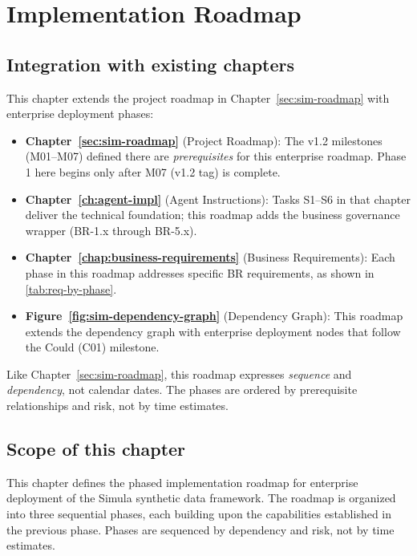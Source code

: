 \chapter{Implementation Roadmap}
\label{chap:implementation-roadmap}

\section*{Integration with existing chapters}

This chapter extends the project roadmap in Chapter~\ref{sec:sim-roadmap} with 
enterprise deployment phases:

\begin{itemize}
  \item \textbf{Chapter~\ref{sec:sim-roadmap}} (Project Roadmap): The v1.2 
    milestones (M01--M07) defined there are \emph{prerequisites} for this 
    enterprise roadmap. Phase 1 here begins only after M07 (v1.2 tag) is complete.
  \item \textbf{Chapter~\ref{ch:agent-impl}} (Agent Instructions): Tasks S1--S6 
    in that chapter deliver the technical foundation; this roadmap adds the 
    business governance wrapper (BR-1.x through BR-5.x).
  \item \textbf{Chapter~\ref{chap:business-requirements}} (Business Requirements): 
    Each phase in this roadmap addresses specific BR requirements, as shown in 
    \cref{tab:req-by-phase}.
  \item \textbf{Figure~\ref{fig:sim-dependency-graph}} (Dependency Graph): This 
    roadmap extends the dependency graph with enterprise deployment nodes that 
    follow the Could (C01) milestone.
\end{itemize}

\noindent
Like Chapter~\ref{sec:sim-roadmap}, this roadmap expresses \emph{sequence} and 
\emph{dependency}, not calendar dates. The phases are ordered by prerequisite 
relationships and risk, not by time estimates.

\section*{Scope of this chapter}

This chapter defines the phased implementation roadmap for enterprise deployment
of the Simula synthetic data framework. The roadmap is organized into three
sequential phases, each building upon the capabilities established in the
previous phase. Phases are sequenced by dependency and risk, not by time
estimates.

